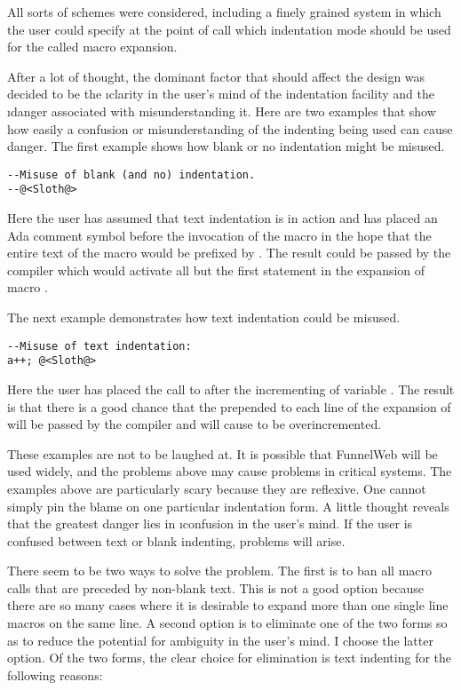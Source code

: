 All sorts of schemes were considered, including a finely grained system in
which the user could specify at the point of call which indentation mode
should be used for the called macro expansion.

After a lot of thought, the dominant factor that should affect the design
was decided to be the \i{clarity} in the user's mind of the indentation facility
and the \i{danger} associated with misunderstanding it. Here are two 
examples that show how easily a confusion or
misunderstanding of the indenting being used can cause danger.
The first example shows how blank or no indentation might be
misused.

\begin{verbatim}
--Misuse of blank (and no) indentation.
--@<Sloth@>
\end{verbatim}

Here the user has assumed that text indentation is in action and has
placed an Ada comment symbol \dqp{--} before the invocation of the macro
 in the hope that the entire text of the macro would be prefixed by
\dqp{--}. The result could be passed by the compiler which would activate all
but the first statement in the expansion of macro .

The next example demonstrates how text indentation could be
misused.

\begin{verbatim}
--Misuse of text indentation:
a++; @<Sloth@>
\end{verbatim}

Here the user has placed the call to  after the incrementing of
variable
. The result is that there is a good chance that the 
prepended to
each line of the expansion of  will be passed by the compiler and
will cause  to be overincremented.

These examples are not to be laughed at. It is possible that FunnelWeb will
be used widely, and the problems above may cause problems in critical systems.
The examples above are particularly scary because they are reflexive. One cannot
simply pin the blame on one particular indentation form. A little thought
reveals that the greatest danger lies in \i{confusion} in the user's mind.
If the
user is confused between text or blank indenting, problems will arise.

There seem to be two ways to solve the problem. The first is to ban all
macro calls that are preceded by non-blank text. This is not a good option
because there are so many cases where it is desirable to expand more than one
single line macros on the same line. A second option is to eliminate one of
the two forms so as to reduce the potential for ambiguity in the user's
mind. I choose the latter option. Of the two forms, the clear choice for
elimination is text indenting for the following reasons:

